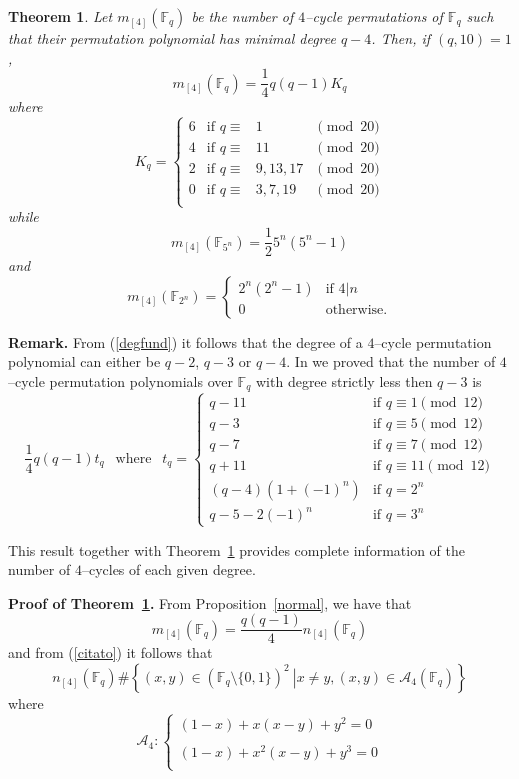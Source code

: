 \documentclass[a4paper,twoside]{article}
\newtheorem{Theorem}{Theorem}[section]
\begin{document}
\begin{Theorem}\label{uno4} Let $m_{[4]}(\mathbb F_q)$ be the number of $4$--cycle permutations
of $\mathbb F_q$ such that their permutation polynomial has minimal degree $q-4$.
Then, if $(q,10)=1$,
$$m_{[4]}(\mathbb F_q)=\frac{1}{4}q(q-1)K_q$$
where
$$K_q=\left\{
\begin{array}{rrll}
6 & \textrm{if } q\equiv &1 &\pmod{20}\\
4 & \textrm{if } q\equiv &11 &\pmod{20}\\
2 & \textrm{if } q\equiv &9,13,17&\pmod{20}\\
0 & \textrm{if } q\equiv & 3,7,19&\pmod{20}\\
\end{array}\right.$$
while
$$m_{[4]}(\mathbb F_{5^n})=\frac{1}{2}{5^n}({5^n-1})$$
and
$$m_{[4]}(\mathbb F_{2^n})=\left\{\begin{array}{rl}
{2^n}({2^n-1}) & \text{if $4|n$}\\
0 & \text{otherwise.}\end{array}\right.
$$
\end{Theorem}

\noindent\textbf{Remark.} {From} (\ref{degfund}) it follows that the degree of a $4$--cycle permutation polynomial
can either be $q-2$, $q-3$
or $q-4$. In \cite{CP} we proved that the number of $4$--cycle permutation polynomials over $\mathbb F_q$ with
degree strictly less then $q-3$ is
$$\frac{1}{4}q(q-1)t_q
\ \ \text{ where }\ \
t_q=\left\{\begin{array}{rl}
q-11 & \text{if } q\equiv 1\pmod{12}\\
q-3  & \text{if } q\equiv 5\pmod{12}\\
q-7 & \text{if } q\equiv 7\pmod{12}\\
q+1 1 & \text{if } q\equiv 11\pmod{12}\\
(q-4)(1+(-1)^n) &  \text{if } q=2^n\\
q-5-2(-1)^n &  \text{if } q=3^n
\end{array}\right.$$

This result together with Theorem~\ref{uno4} provides complete
information of the number of $4$--cycles of each given
degree.\bigskip

\noindent\textbf{Proof of Theorem~\ref{uno4}.}
{From} Proposition~\ref{normal}, we have that
$$m_{[4]}(\mathbb F_q)=\frac{q(q-1)}{4}n_{[4]}(\mathbb F_q)$$
and from (\ref{citato}) it follows that
$$n_{[4]}(\mathbb F_q)
\#\left\{(x,y)\in(\mathbb F_q\setminus\{0,1\})^2\ \left| {x\neq y},
(x,y)\in\mathcal A_4(\mathbb F_q)\right.\right\}$$
where
$$\mathcal A_4:\left\{
\begin{array}{r}
(1-x)+x(x-y)+y^2=0\\
\\
(1-x)+x^2(x-y)+y^3=0\\
\end{array}
\right.$$
\end{document}
